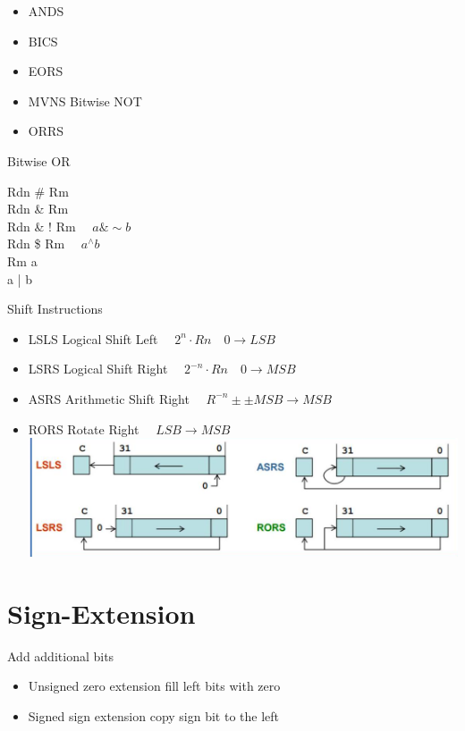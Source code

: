 \documentclass[10pt]{article}
\begin{document}
\begin{itemize}
  \item ANDS
  \item BICS
  \item EORS
  \item MVNS Bitwise NOT
  \item ORRS
\end{itemize}

Bitwise OR

Rdn \# Rm\\
Rdn \& Rm\\
Rdn \& ! Rm $\quad a \& \sim b$\\
Rdn \$ Rm $\quad a{ }^{\wedge} b$\\
Rm a\\
a | b

Shift Instructions

\begin{itemize}
  \item LSLS Logical Shift Left $\quad 2^{n} \cdot R n \quad 0 \rightarrow L S B$
  \item LSRS Logical Shift Right $\quad 2^{-n} \cdot R n \quad 0 \rightarrow M S B$
  \item ASRS Arithmetic Shift Right $\quad R^{-n} \pm \pm M S B \rightarrow M S B$
  \item RORS Rotate Right $\quad L S B \rightarrow M S B$\\
\includegraphics[max width=\textwidth, center]{2024_12_29_79e6b22f503fb7b4f718g-06}
\end{itemize}

\section*{Sign-Extension}
Add additional bits

\begin{itemize}
  \item Unsigned zero extension fill left bits with zero
  \item Signed sign extension copy sign bit to the left
\end{itemize}
\end{document}
